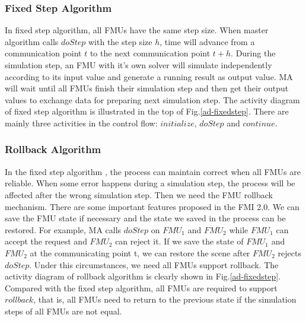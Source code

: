 \subsubsection{Fixed Step Algorithm}
In fixed step algorithm, all FMUs have the same step size. When master algorithm calls $doStep$ with the step size $h$, time will advance from a communication point $t$ to the next communication point $t+h$. During the simulation step, an FMU with it's own solver will simulate independently according to its input value and generate a running result as output value. MA will wait until all FMUs finish their simulation step and then get their output values to exchange data for preparing next simulation step. The activity diagram of fixed step algorithm is illustrated in the top of Fig.\ref{ad-fixedstep}. There are mainly three activities in the control flow: $initialize$, $doStep$ and $continue$.
\subsubsection{Rollback Algorithm}
In the fixed step algorithm \cite{BromanBGLMTW13}, the process can maintain correct when all FMUs are reliable. When some error happens during a simulation step, the process will be affected after the wrong simulation step. Then we need the FMU rollback mechanism. There are some important features proposed in the FMI 2.0. We can save the FMU state if necessary and the state we saved in the process can be restored. For example, MA calls $doStep$ on $FMU_{1}$ and $FMU_{2}$ while $FMU_{1}$ can accept the request and $FMU_{2}$ can reject it. If we save the state of $FMU_{1}$ and $FMU_{2}$ at the communicating point t, we can restore the scene after $FMU_{2}$ rejects $doStep$. Under this circumstances, we need all FMUs support rollback. The activity diagram of rollback algorithm is clearly shown in Fig.\ref{ad-fixedstep}. Compared with the fixed step algorithm, all FMUs are required to support $rollback$, that is, all FMUs need to return to the previous state if the simulation steps of all FMUs are not equal.

